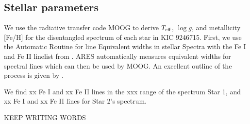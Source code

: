 \subsection{Stellar parameters}\label{parameters}
We use the radiative transfer code MOOG \citep{sne73} to derive $T_{\rm{eff}}$, $\log g$, and metallicity [Fe/H] for the disentangled spectrum of each star in KIC 9246715. First, we use the Automatic Routine for line Equivalent widths in stellar Spectra \citep[ARES,][]{Sousa_2007} with the Fe I and Fe II linelist from \citet{Yong_2005}. ARES automatically measures equivalent widths for spectral lines which can then be used by MOOG. An excellent outline of the process is given by \citet{Sousa_2014}.

We find xx Fe I and xx Fe II lines in the xxx range of the spectrum Star 1, and xx Fe I and xx Fe II lines for Star 2's spectrum. 

KEEP WRITING WORDS